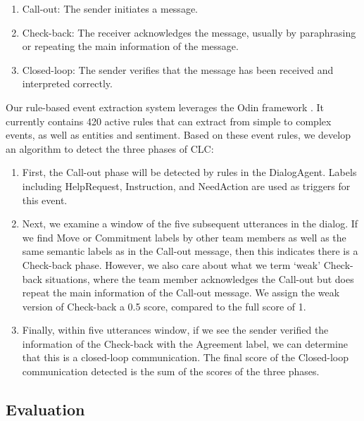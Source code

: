 \begin{enumerate}
    \item Call-out: The sender initiates a message.
    \item Check-back: The receiver acknowledges the message, usually by
        paraphrasing or repeating the main information of the message.
    \item Closed-loop: The sender verifies that the message has been received
        and interpreted correctly.
\end{enumerate}

Our rule-based event extraction system leverages the Odin framework
\cite{valenzuela-escarcega-etal-2016-odins}. It currently contains 420 active
rules that can extract from simple to complex events, as well as entities and
sentiment. Based on these event rules, we develop an algorithm to detect the
three phases of CLC:

\begin{enumerate}

    \item First, the Call-out phase will be detected by rules in the
        DialogAgent.  Labels including HelpRequest, Instruction, and NeedAction
        are used as triggers for this event.

    \item Next, we examine a window of the five subsequent utterances in the
        dialog. If we find Move or Commitment labels by other team members as
        well as the same semantic labels as in the Call-out message, then this
        indicates there is a Check-back phase. However, we also care about what
        we term `weak' Check-back situations, where the team member
        acknowledges the Call-out but does repeat the main information of the
        Call-out message. We assign the weak version of Check-back a 0.5 score,
        compared to the full score of 1. 

    \item Finally, within five utterances window, if we see the sender verified
        the information of the Check-back with the Agreement label, we can
        determine that this is a closed-loop communication. The final score of
        the Closed-loop communication detected is the sum of the scores of the
        three phases.

\end{enumerate}

\subsection{Evaluation}

